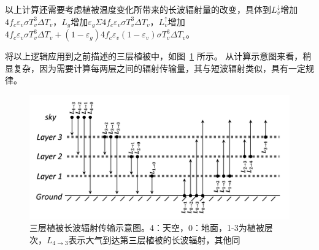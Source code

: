 以上计算还需要考虑植被温度变化所带来的长波辐射量的改变，具体到$L_v^\downarrow$增加$4f_c\varepsilon_v\sigma T_v^3\Delta T_v$，${L_{g}}$增加$\varepsilon_{g} \Sigma 4 f_{c} \varepsilon_{v} \sigma T_{v}^{3} \Delta T_{v}$，$L_v ^\uparrow$增加$4 f_{c} \varepsilon_{v} \sigma T_{v}^{3} \Delta T_{v}+(1-\varepsilon_{g}) 4 f_{c} 
\varepsilon_{v}(1-\varepsilon_{v}) \sigma T_{v}^{3} \Delta T_{v}$。

将以上逻辑应用到之前描述的三层植被中，如图~\ref{fig:三层植被长波辐射传输示意图} 所示。
从计算示意图来看，稍显复杂，因为需要计算每两层之间的辐射传输量，其与短波辐射类似，具有一定规律。
%
{
\begin{figure}[htbp]
\centering
\includegraphics[width=0.8\columnwidth]{Figures/辐射过程及辐射通量计算/三层植被长波辐射传输示意图.png}
\caption{三层植被长波辐射传输示意图。4：天空，0：地面，1-3为植被层次，$L_{4 \rightarrow 3}$表示大气到达第三层植被的长波辐射，其他同}
\label{fig:三层植被长波辐射传输示意图}
\end{figure}
}
%

